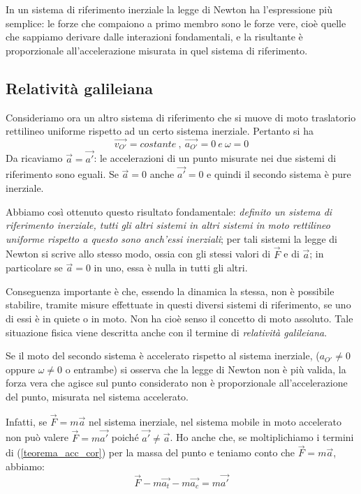 \documentclass[class=book, crop=false, oneside, 12pt]{standalone}
\begin{document}
In un sistema di riferimento inerziale la legge di Newton ha l'espressione più semplice: 
le forze che compaiono a primo membro sono le forze vere, cioè quelle che sappiamo derivare dalle interazioni fondamentali, e la risultante è proporzionale all'accelerazione misurata in quel sistema di riferimento. 

\subsection{Relatività galileiana}

Consideriamo ora un altro sistema di riferimento che si muove di moto traslatorio rettilineo uniforme rispetto ad un certo sistema inerziale. 
Pertanto si ha 
\begin{equation}
    \overrightarrow{v_{O'}} = costante \ , \ \overrightarrow{a_{O'}} = 0 \ e \ \omega = 0
\end{equation}
Da ricaviamo \(\overrightarrow{a} = \overrightarrow{a'}\): le accelerazioni di un punto misurate nei due sistemi di riferimento sono eguali. 
Se \(\overrightarrow{a} = 0\) anche \(\overrightarrow{a'}= 0\) e quindi il secondo sistema è pure inerziale. 

Abbiamo così ottenuto questo risultato fondamentale: \emph{definito un sistema di riferimento inerziale, tutti gli altri sistemi in altri sistemi in moto rettilineo uniforme rispetto a questo sono anch'essi inerziali};
per tali sistemi la legge di Newton si scrive allo stesso modo, ossia con gli stessi valori di \(\overrightarrow{F}\) e di \(\overrightarrow{a}\); in particolare se \(\overrightarrow{a} = 0\) in uno, essa è nulla in tutti gli altri.

Conseguenza importante è che, essendo la dinamica la stessa, non è possibile stabilire, tramite misure effettuate in questi diversi sistemi di riferimento, se uno di essi è in quiete o in moto. 
Non ha cioè senso il concetto di moto assoluto. 
Tale situazione fisica viene descritta anche con il termine di \emph{relatività galileiana}.

Se il moto del secondo sistema è accelerato rispetto al sistema inerziale, (\(a_{O'} \neq 0\) oppure \(\omega \neq 0\) o entrambe) si osserva che la legge di Newton non è più valida, la forza vera che agisce sul punto considerato non è proporzionale all'accelerazione del punto, misurata nel sistema accelerato.

Infatti, se \(\overrightarrow{F} = m \overrightarrow{a}\) nel sistema inerziale, nel sistema mobile in moto accelerato non può valere \(\overrightarrow{F} = m \overrightarrow{a'}\) poiché \( \overrightarrow{a'} \neq \overrightarrow{a}\).
Ho anche che, se moltiplichiamo i termini di (\ref{teorema_acc_cor}) per la massa del punto e teniamo conto che \(\overrightarrow{F} = m \overrightarrow{a}\), abbiamo:
\begin{equation} \label{f_rel}
    \overrightarrow{F} - m \overrightarrow{a_t} - m \overrightarrow{a_c} = m \overrightarrow{a'}
\end{equation}
\end{document}
